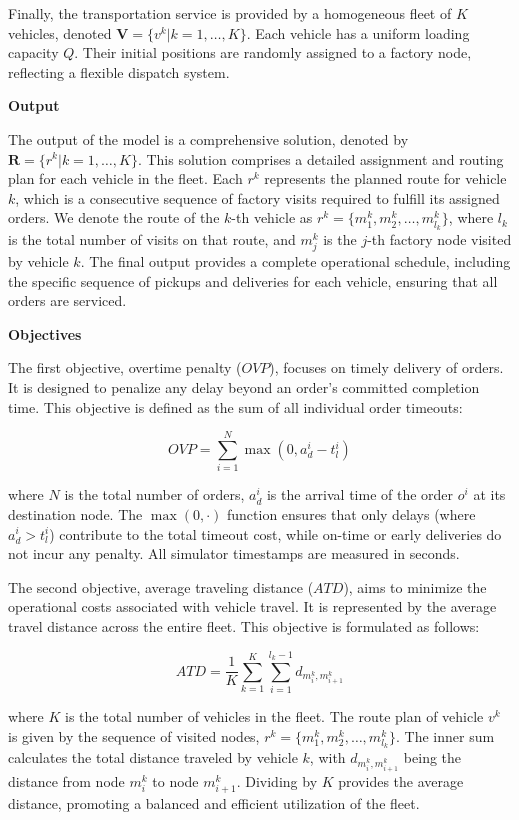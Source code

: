 \documentclass[pdflatex]{sn-jnl}
\begin{document}
Finally, the transportation service is provided by a homogeneous fleet of $K$ vehicles, denoted $\textbf{V} = \{v^k | k = 1, \dots, K\}$. Each vehicle has a uniform loading capacity $Q$. Their initial positions are randomly assigned to a factory node, reflecting a flexible dispatch system. 

\textbf{Output}

The output of the model is a comprehensive solution, denoted by $\textbf{R} = \{r^k | k = 1, \dots, K\}$. This solution comprises a detailed assignment and routing plan for each vehicle in the fleet. Each $r^k$ represents the planned route for vehicle $k$, which is a consecutive sequence of factory visits required to fulfill its assigned orders. We denote the route of the $k$-th vehicle as $r^k = \{m_1^k, m_2^k, \dots, m_{l_k}^k\}$, where $l_k$ is the total number of visits on that route, and $m_j^k$ is the $j$-th factory node visited by vehicle $k$. The final output provides a complete operational schedule, including the specific sequence of pickups and deliveries for each vehicle, ensuring that all orders are serviced.

\textbf{Objectives}

The first objective, overtime penalty ($OVP$), focuses on timely delivery of orders. It is designed to penalize any delay beyond an order's committed completion time. This objective is defined as the sum of all individual order timeouts:

\begin{equation}
OVP = \sum_{i=1}^{N} \max(0, a_d^i - t_l^i)
\end{equation}

where $N$ is the total number of orders, $a_d^i$ is the arrival time of the order $o^i$ at its destination node. The $\max(0, \cdot)$ function ensures that only delays (where $a_d^i > t_l^i$) contribute to the total timeout cost, while on-time or early deliveries do not incur any penalty. All simulator timestamps are measured in seconds.

The second objective, average traveling distance ($ATD$), aims to minimize the operational costs associated with vehicle travel. It is represented by the average travel distance across the entire fleet. This objective is formulated as follows:

\begin{equation}
ATD = \frac{1}{K} \sum_{k=1}^{K} \sum_{i=1}^{l_k - 1} d_{m_i^k, m_{i+1}^k}
\end{equation}

where $K$ is the total number of vehicles in the fleet. The route plan of vehicle $v^k$ is given by the sequence of visited nodes, $r^k = \{m_1^k, m_2^k, \dots, m_{l_k}^k\}$. The inner sum calculates the total distance traveled by vehicle $k$, with $d_{m_i^k, m_{i+1}^k}$ being the distance from node $m_i^k$ to node $m_{i+1}^k$. Dividing by $K$ provides the average distance, promoting a balanced and efficient utilization of the fleet.
\end{document}
